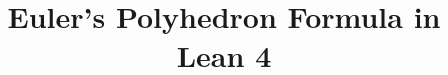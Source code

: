 \usepackage{amsfonts}
\usepackage{amsthm}
\usepackage{amsmath}
\usepackage{amssymb}
\usepackage{hyperref}

\ifplastex
\else
\hypersetup{
  colorlinks=true,
  linkcolor=blue,
  citecolor=blue,
  urlcolor=blue
}
\fi

\theoremstyle{plain}
\newtheorem{theorem}{Theorem}[section]
\newtheorem{lemma}[theorem]{Lemma}
\newtheorem{corollary}[theorem]{Corollary}
\newtheorem{proposition}[theorem]{Proposition}

\theoremstyle{definition}
\newtheorem{definition}[theorem]{Definition}
\newtheorem{example}[theorem]{Example}

\theoremstyle{remark}
\newtheorem{remark}[theorem]{Remark}

\newcommand{\N}{\mathbb{N}}
\newcommand{\Z}{\mathbb{Z}}
\newcommand{\R}{\mathbb{R}}
\newcommand{\D}{\mathcal{D}}

\title{Euler's Polyhedron Formula in Lean 4}
